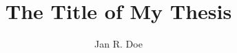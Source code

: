 \documentclass[10pt,oneside]{ttuthesis}
\title{The Title of My Thesis}
\author{Jan R. Doe}
\begin{document}

\begin{Spacing}{1}
\tableofcontents*  %
\listoftables      %
\listoffigures     %
\lstlistoflistings %
\renewcommand{\nomname}{LIST OF SYMBOLS}
\printnomenclature %
\end{Spacing}

\mainmatter
\end{document}

